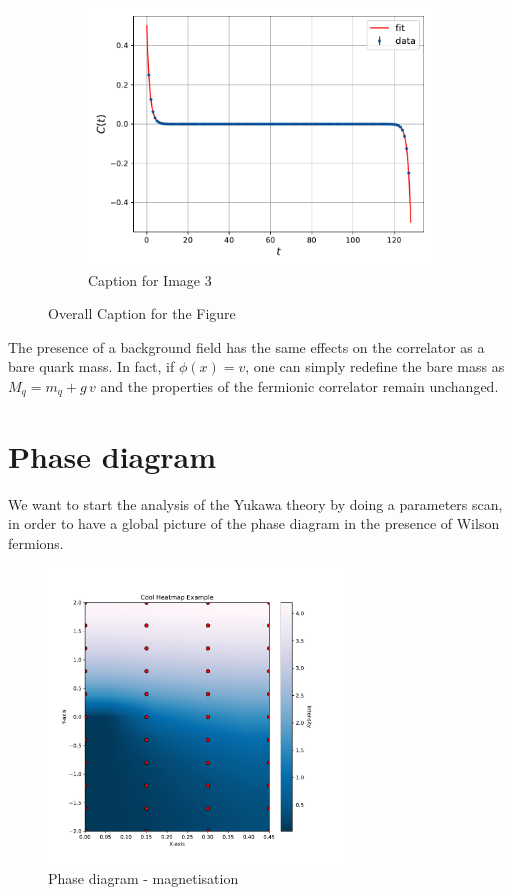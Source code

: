 \begin{figure}
\begin{subfigure}[b]{0.45\textwidth}
        \includegraphics[width=\textwidth]{figures/correlator/corrs_free/corr_big.pdf}
        \caption{Caption for Image 3}
    \end{subfigure}
    \caption{Overall Caption for the Figure}
\end{figure}
The presence of a background field has the same effects on the correlator as a bare quark mass. In fact, if $\phi(x) = v$, one can simply redefine the bare mass as $M_q = m_q + g \, v$ and the properties of the fermionic correlator remain unchanged.
\newpage

\section{Phase diagram}

We want to start the analysis of the Yukawa theory by doing a parameters scan, in order to have a global picture of the phase diagram in the presence of Wilson fermions.
\begin{figure}
    \centering
    \includegraphics[width=0.7\textwidth]{figures/phase_diagram/phi.pdf}
    \caption{Phase diagram - magnetisation}
    \label{fig:phase_diagram_phi}
\end{figure}

